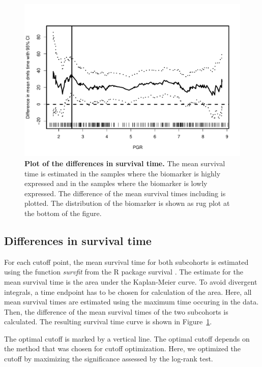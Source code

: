\documentclass[12pt, a4paper]{article}
\begin{document}
\begin{figure}[t]
\centering
\includegraphics{Cutoff_Finder_manual-006}
\caption{\textbf{Plot of the differences in survival time.}
The mean survival time is estimated in the samples where the biomarker is highly expressed
and in the samples where the biomarker is lowly expressed.
The difference of the mean survival times including is plotted.
The distribution of the biomarker is shown as rug plot at the bottom of the figure.}
\label{fig:diff}
\end{figure}

\subsection{Differences in survival time}
For each cutoff point, the mean survival time for both subcohorts is estimated using the function \emph{survfit} from the R package survival \cite{survival}.
The estimate for the mean survival time is the area under the Kaplan-Meier curve.
To avoid divergent integrals, a time endpoint has to be chosen for calculation of the area.
Here, all mean survival times are estimated using the maximum time occuring in the data.
Then, the difference of the mean survival times of the two subcohorts is calculated.
The resulting survival time curve is shown in Figure~\ref{fig:diff}.

The optimal cutoff is marked by a vertical line.
The optimal cutoff depends on the method that was chosen for cutoff optimization.
Here, we optimized the cutoff by maximizing the significance assessed by the log-rank test.

\newpage
\end{document}
